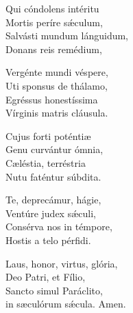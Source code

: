  Qui cóndolens intéritu\\ 
    Mortis períre sǽculum,\\  
    Salvásti mundum lánguidum,\\  
    Donans reis remédium, 

 Vergénte mundi véspere,\\  
    Uti sponsus de thálamo,\\  
    Egréssus honestíssima\\  
    Vírginis matris cláusula. 

 Cujus forti pot\-éntiæ\\  
    Genu curvántur ó\-mnia,\\  
    Cæléstia, terréstria\\  
     Nutu faténtur súbdita. 

 Te, deprecámur, hágie,\\  
    Ventúre judex sǽculi,\\  
    Consérva nos in témpore,\\  
    Hostis a telo pérfidi. 

 Laus, honor, virtus, glória,\\  
    Deo Patri, et Fílio,\\  
    San\-cto simul Paráclito,\\  
    in sæculórum sǽcula. 
Amen.